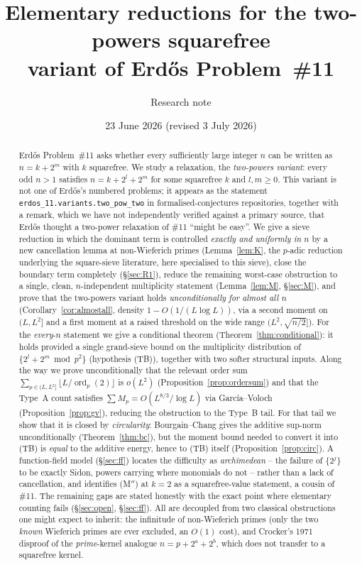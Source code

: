 \documentclass[11pt]{article}
\title{\bf Elementary reductions for the two-powers squarefree\\
variant of Erd\H{o}s Problem~\#11}
\author{Research note}
\date{23 June 2026 (revised 3 July 2026)}
\theoremstyle{plain}
\theoremstyle{definition}
\theoremstyle{remark}
\newcommand{\ord}{\operatorname{ord}}
\begin{document}
\maketitle

\begin{abstract}
\noindent Erd\H{o}s Problem~\#11 asks whether every sufficiently large integer
$n$ can be written as $n=k+2^m$ with $k$ squarefree. We study a relaxation,
the \emph{two-powers variant}: every odd $n>1$ satisfies
$n=k+2^l+2^m$ for some squarefree $k$ and $l,m\ge0$. This variant is not one of
Erd\H{o}s's numbered problems; it appears as the statement
\texttt{erdos\_11.variants.two\_pow\_two} in formalised-conjectures
repositories, together with a remark, which we have not independently
verified against a primary source, that Erd\H{o}s thought a two-power
relaxation of \#11 ``might be easy''. We give a sieve reduction in which the
dominant term is controlled \emph{exactly and uniformly in $n$} by a new
cancellation lemma at non-Wieferich primes (Lemma~\ref{lem:K}, the $p$-adic
reduction underlying the square-sieve literature, here specialised to this sieve),
close the boundary term completely (\S\ref{sec:R1}), reduce the remaining
worst-case obstruction to a single, clean, $n$-independent multiplicity
statement (Lemma~\ref{lem:M}, \S\ref{sec:M}), and prove that the two-powers
variant holds \emph{unconditionally for almost all $n$}
(Corollary~\ref{cor:almostall}, density $1-O(1/(L\log L))$, via a second moment on
$(L,L^2]$ and a first moment at a raised threshold on the wide range
$(L^2,\sqrt{n/2}]$).
For the \emph{every}-$n$ statement we give a conditional theorem
(Theorem~\ref{thm:conditional}): it holds provided a single grand-sieve bound
on the multiplicity distribution of $\{2^l+2^m\bmod p^2\}$ (hypothesis (TB)),
together with two softer structural inputs. Along the way we prove unconditionally
that the relevant order sum $\sum_{p\in(L,L^2]}\lfloor L/\ord_p(2)\rfloor$ is
$o(L^2)$ (Proposition~\ref{prop:ordersum}) and that the Type~A count satisfies
$\sum M_p=O(L^{8/3}/\log L)$ via García--Voloch (Proposition~\ref{prop:gv}),
reducing the obstruction to the Type~B tail. For that tail we show that it is
closed by \emph{circularity}: Bourgain--Chang gives
the additive sup-norm unconditionally (Theorem~\ref{thm:bc}), but the moment bound
needed to convert it into (TB) is \emph{equal} to the additive energy, hence to
(TB) itself (Proposition~\ref{prop:circ}). A function-field model (\S\ref{sec:ff})
locates the difficulty as \emph{archimedean} -- the failure of $\{2^j\}$ to be
exactly Sidon, powers carrying where monomials do not -- rather than a lack of
cancellation, and identifies (M$''$) at $k=2$ as a squarefree-value statement, a
cousin of \#11. The remaining gaps are stated honestly with the exact point where
elementary counting fails (\S\ref{sec:open}, \S\ref{sec:ff}). All are decoupled
from two classical obstructions one might expect to inherit: the
infinitude of non-Wieferich primes (only the two \emph{known} Wieferich
primes are ever excluded, an $O(1)$ cost), and Crocker's 1971 disproof of the
\emph{prime}-kernel analogue $n=p+2^a+2^b$, which does not transfer to a
squarefree kernel.
\end{abstract}
\end{document}
